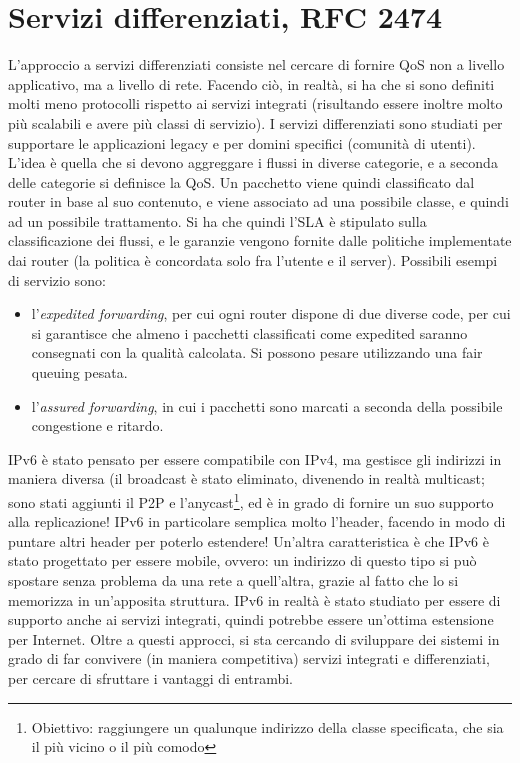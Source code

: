 \section{Servizi differenziati, RFC 2474}
L'approccio a servizi differenziati consiste nel cercare di fornire QoS non a
livello applicativo, ma a livello di
rete. Facendo ciò, in realtà, si ha che si sono definiti molti meno protocolli
rispetto ai servizi integrati
(risultando essere inoltre molto più scalabili e avere più classi di servizio).
I servizi differenziati sono studiati per supportare le applicazioni legacy e
per domini specifici (comunità di utenti). L'idea è quella che si devono
aggreggare i flussi in diverse categorie, e a seconda delle categorie si
definisce la QoS. Un pacchetto viene quindi classificato dal router in base al
suo contenuto, e viene associato ad una possibile classe, e quindi ad un
possibile trattamento.
Si ha che quindi l'SLA è stipulato sulla classificazione dei flussi, e le
garanzie vengono fornite dalle politiche
implementate dai router (la politica è concordata solo fra l'utente e il
server).
Possibili esempi di servizio sono:
\begin{itemize}
 \item l'\textit{expedited forwarding}, per cui ogni router dispone di due
diverse code, per cui si garantisce che
 almeno i pacchetti classificati come expedited saranno consegnati con la
qualità calcolata. Si possono pesare
 utilizzando una fair queuing pesata.
 \item l'\textit{assured forwarding}, in cui i pacchetti sono marcati a seconda
della possibile congestione e ritardo.
\end{itemize}
IPv6 è stato pensato per essere compatibile con IPv4, ma gestisce gli indirizzi
in maniera diversa (il broadcast è
stato eliminato, divenendo in realtà multicast; sono stati aggiunti il P2P e
l'anycast\footnote{Obiettivo: raggiungere un qualunque indirizzo della classe
specificata, che sia il più vicino o il più comodo}, ed è in grado di fornire un
suo supporto alla replicazione! IPv6 in particolare semplica molto l'header,
facendo in modo di puntare altri header per poterlo estendere! Un'altra
caratteristica è che IPv6 è stato progettato per essere mobile, ovvero: un
indirizzo di questo tipo si può spostare senza problema da una rete a
quell'altra, grazie al fatto che lo si memorizza in
un'apposita struttura. IPv6 in realtà è stato studiato per essere di supporto
anche ai servizi integrati, quindi
potrebbe essere un'ottima estensione per Internet.
Oltre a questi approcci, si sta cercando di sviluppare dei sistemi in grado di
far convivere (in maniera competitiva)
servizi integrati e differenziati, per cercare di sfruttare i vantaggi di
entrambi.